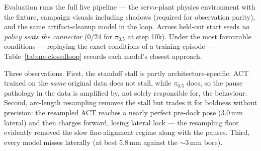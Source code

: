 Evaluation runs the full live pipeline --- the servo-plant physics
environment with the fixture, campaign visuals including shadows
(required for observation parity), and the same artifact-cleanup
model in the loop. Across held-out start seeds \emph{no policy seats
the connector} ($0/24$ for $\pi_{0.5}$ at step 10k). Under the most
favourable conditions --- replaying the exact conditions of a
training episode --- Table~\ref{tab:nc-closedloop} records each
model's closest approach.

\begin{table}[!htp]
\centering
\caption{Closed-loop behaviour under training-episode conditions.
``Original'' is the 1000-episode set; ``resampled'' its arc-length
resampled variant. Depth is distance short of the seat at closest
approach; the bore tolerance is $\sim$3\,mm lateral.}
\label{tab:nc-closedloop}
\end{table}

Three observations. First, the standoff stall is partly
architecture-specific: ACT trained on the \emph{same} original data
does not stall, while $\pi_{0.5}$ does, so the pause pathology in
the data is amplified by, not solely responsible for, the behaviour.
Second, arc-length resampling removes the stall but trades it for
boldness without precision: the resampled ACT reaches a nearly
perfect pre-dock pose ($3.0$\,mm lateral) and then charges forward,
losing lateral lock --- the resampling floor evidently removed the
slow fine-alignment regime along with the pauses. Third,
\textcolor{cmured}{every model misses laterally} (at best
$5.8$\,mm against the $\sim$3\,mm bore).

